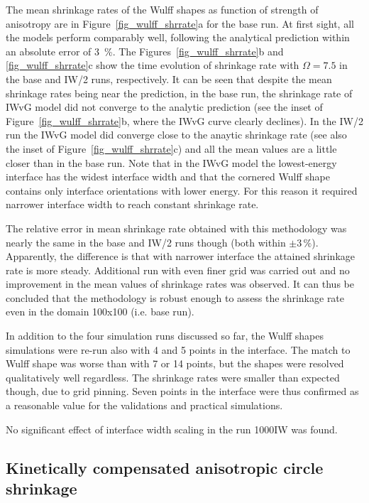 The mean shrinkage rates of the Wulff shapes as function of strength of anisotropy are in Figure~\ref{fig_wulff_shrrate}a for the base run. At first sight, all the models perform comparably well, following the analytical prediction within an absolute error of 3~\%. The Figures~\ref{fig_wulff_shrrate}b and \ref{fig_wulff_shrrate}c show the time evolution of shrinkage rate with $\Omega=7.5$ in the base and IW/2 runs, respectively. It can be seen that despite the mean shrinkage rates being near the prediction, in the base run, the shrinkage rate of IWvG model did not converge to the analytic prediction (see the inset of Figure~\ref{fig_wulff_shrrate}b, where the IWvG curve clearly declines). In the IW/2 run the IWvG model did converge close to the anaytic shrinkage rate (see also the inset of Figure~\ref{fig_wulff_shrrate}c) and all the mean values are a little closer than in the base run. Note that in the IWvG model the lowest-energy interface has the widest interface width and that the cornered Wulff shape contains only interface orientations with lower energy. For this reason it required narrower interface width to reach constant shrinkage rate.

The relative error in mean shrinkage rate obtained with this methodology was nearly the same in the base and IW/2 runs though (both within $\pm3\,\%$). Apparently, the difference is that with narrower interface the attained shrinkage rate is more steady. Additional run with even finer grid was carried out and no improvement in the mean values of shrinkage rates was observed. It can thus be concluded that the methodology is robust enough to assess the shrinkage rate even in the domain 100x100 (i.e. base run).

In addition to the four simulation runs discussed so far, the Wulff shapes simulations were re-run also with 4 and 5 points in the interface. The match to Wulff shape was worse than with 7 or 14 points, but the shapes were resolved qualitatively well regardless. The shrinkage rates were smaller than expected though, due to grid pinning. Seven points in the interface were thus confirmed as a reasonable value for the validations and practical simulations. 

No significant effect of interface width scaling in the run 1000IW was found.

\subsection{Kinetically compensated anisotropic circle shrinkage}

